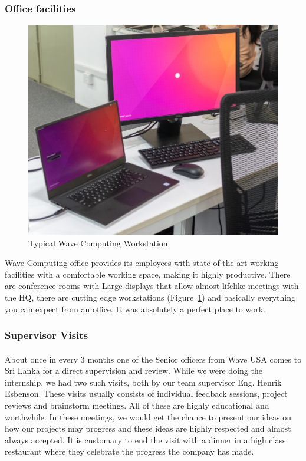\subsubsection{Office facilities}

\begin{figure}[H]
    \centering
    \includegraphics[trim=0cm 0cm 0cm 0cm, clip=true,scale=0.5]{figures/workstation.jpg}
    \caption{Typical Wave Computing Workstation\label{Fig:workstation}}\vspace{-4mm}
    \end{figure}

Wave Computing office provides its employees with state of the art working facilities with a comfortable working space, making it highly productive. There are conference rooms with Large displays that allow almost lifelike meetings with the HQ, there are cutting edge workstations (Figure~\ref{Fig:workstation}) and basically everything you can expect from an office. It was absolutely a perfect place to work.

\subsubsection{Supervisor Visits}
\paragraph{}
About once in every 3 months one of the Senior officers from Wave USA comes to Sri Lanka for a direct supervision and review. While we were doing the internship, we had two such visits, both by our team supervisor Eng. Henrik Esbenson. These visits usually consists of individual feedback sessions, project reviews and brainstorm meetings. All of these are highly educational and worthwhile. In these meetings, we would get the chance to present our ideas on how our projects may progress and these ideas are highly respected and almost always accepted. It is customary to end the visit with a dinner in a high class restaurant where they celebrate the progress the company has made.

 